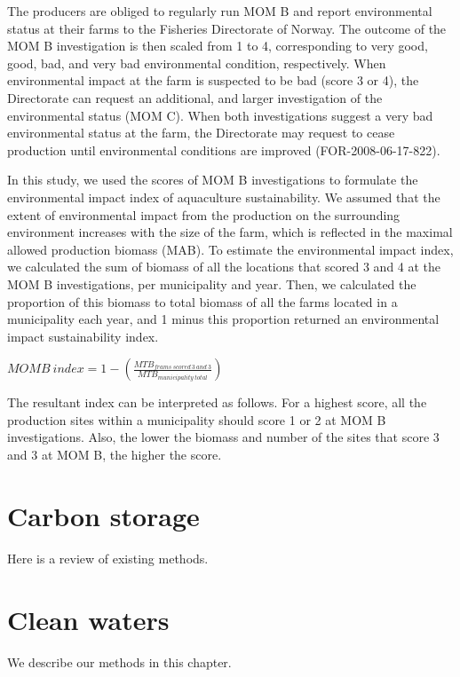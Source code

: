 \documentclass[
]{book}
\begin{document}
The producers are obliged to regularly run MOM B and report environmental status at their farms to the Fisheries Directorate of Norway. The outcome of the MOM B investigation is then scaled from 1 to 4, corresponding to very good, good, bad, and very bad environmental condition, respectively. When environmental impact at the farm is suspected to be bad (score 3 or 4), the Directorate can request an additional, and larger investigation of the environmental status (MOM C). When both investigations suggest a very bad environmental status at the farm, the Directorate may request to cease production until environmental conditions are improved (FOR-2008-06-17-822).

In this study, we used the scores of MOM B investigations to formulate the environmental impact index of aquaculture sustainability. We assumed that the extent of environmental impact from the production on the surrounding environment increases with the size of the farm, which is reflected in the maximal allowed production biomass (MAB). To estimate the environmental impact index, we calculated the sum of biomass of all the locations that scored 3 and 4 at the MOM B investigations, per municipality and year. Then, we calculated the proportion of this biomass to total biomass of all the farms located in a municipality each year, and 1 minus this proportion returned an environmental impact sustainability index.

\(MOMB \ index = 1 - (\frac{MTB_{frams \ scored \ 3 \ and \ 3}}{MTB_{municipality \ total}})\)

The resultant index can be interpreted as follows. For a highest score, all the production sites within a municipality should score 1 or 2 at MOM B investigations. Also, the lower the biomass and number of the sites that score 3 and 3 at MOM B, the higher the score.

\hypertarget{carbon-storage}{%
\chapter{Carbon storage}\label{carbon-storage}}

Here is a review of existing methods.

\hypertarget{clean-waters}{%
\chapter{Clean waters}\label{clean-waters}}

We describe our methods in this chapter.

  
\end{document}

